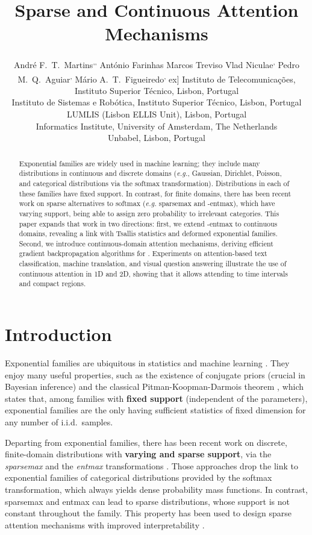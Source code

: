 \documentclass{article}
\title{Sparse and Continuous Attention Mechanisms}
\author{Andr\'e F.~T.~Martins\textsuperscript{\markIT,\markLUMLIS,\markUnbabel} 
  \And
  Ant\'onio Farinhas\textsuperscript{\markIT} 
  \And
  Marcos Treviso\textsuperscript{\markIT} 
  \AND
  Vlad Niculae\textsuperscript{\markUvA,\markIT}\And
  Pedro M.~Q.~Aguiar\textsuperscript{\markISR,\markLUMLIS} 
  \And
  M\'ario A.~T.~Figueiredo\textsuperscript{\markIT,\markLUMLIS} 
  \AND \2ex]
  \textsuperscript{\markIT{}}Instituto de Telecomunica\c{c}\~oes,  Instituto Superior Técnico, Lisbon, Portugal \\
  \textsuperscript{\markISR{}}Instituto de Sistemas e Rob\'otica, Instituto Superior Técnico, Lisbon, Portugal \\
  \textsuperscript{\markLUMLIS{}}LUMLIS (Lisbon ELLIS Unit), Lisbon, Portugal \\
  \textsuperscript{\markUvA{}}Informatics Institute, University of Amsterdam, The Netherlands \\
  \textsuperscript{\markUnbabel{}}Unbabel, Lisbon, Portugal
}
\newcommand{\remove}[1]{}
\begin{document}
\maketitle
\begin{abstract}
Exponential families are widely used in machine learning; they include many distributions in continuous and discrete domains (\textit{e.g.}, Gaussian, Dirichlet, Poisson, and categorical distributions via the softmax transformation). Distributions in each of these families have fixed support. In contrast, for finite domains, there has been recent work on sparse alternatives to softmax (\textit{e.g.} sparsemax and -entmax), which have varying support, being able to assign zero probability to irrelevant categories.
This paper expands that work in two directions: first, we extend -entmax\remove{and Fenchel-Young (FY) losses} to continuous domains, revealing a link with Tsallis statistics and deformed exponential families. 
Second, we introduce continuous-domain attention mechanisms, deriving efficient gradient backpropagation algorithms for .
Experiments on  attention-based text classification, machine translation, and visual question answering  illustrate the use of continuous attention in 1D and 2D, showing that it allows attending to time intervals and compact regions.\remove{and FY-based interval regression on weather data.}
\end{abstract}

\section{Introduction}

Exponential families are ubiquitous in statistics and machine learning \citep{brown1986fundamentals,barndorff2014information}. They enjoy many useful properties, such as the existence of conjugate priors (crucial in Bayesian inference) and 
the classical Pitman-Koopman-Darmois theorem \citep{pitman1936sufficient,darmois1935lois,koopman1936distributions}, which states that,
among families with {\bf fixed support} (independent of the parameters), exponential families are the only having sufficient statistics of fixed dimension for any number of i.i.d.\ samples.

Departing from exponential families, there has been recent work on discrete, finite-domain distributions with {\bf varying and sparse support},  via the \textit{sparsemax} and the \textit{entmax} transformations \citep{Martins2016ICML,blondel2020learning,peters2019sparse}. 
Those approaches drop the link to exponential families of categorical distributions provided by the softmax transformation, which always yields dense probability mass functions. In contrast, sparsemax and entmax can lead to sparse distributions, whose support is not constant throughout the family. This property has been used \remove{to obtain new loss functions for multi-label classification and sparse sequence-to-sequence problems, as well as} to design sparse attention mechanisms with improved interpretability \citep{peters2019sparse,correia2019adaptively}.
\end{document}
